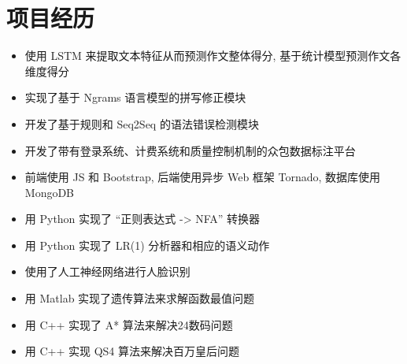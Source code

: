 \section{项目经历}

\begin{itemize}
  \item 使用 LSTM 来提取文本特征从而预测作文整体得分, 基于统计模型预测作文各维度得分
  \item 实现了基于 Ngrams 语言模型的拼写修正模块
  \item 开发了基于规则和 Seq2Seq 的语法错误检测模块
\end{itemize}

\begin{itemize}
  \item 开发了带有登录系统、计费系统和质量控制机制的众包数据标注平台
  \item 前端使用 JS 和 Bootstrap, 后端使用异步 Web 框架 Tornado, 数据库使用 MongoDB
\end{itemize}

\begin{itemize}
  \item 用 Python 实现了 ``正则表达式 -> NFA'' 转换器
  \item 用 Python 实现了 LR(1) 分析器和相应的语义动作
\end{itemize}

\begin{itemize}
  \item 使用了人工神经网络进行人脸识别
  \item 用 Matlab 实现了遗传算法来求解函数最值问题
  \item 用 C++ 实现了 A* 算法来解决24数码问题
  \item 用 C++ 实现 QS4 算法来解决百万皇后问题
\end{itemize}

